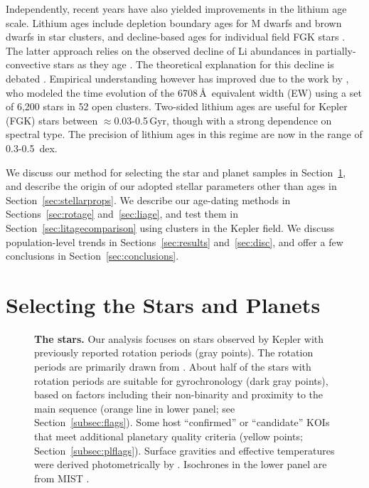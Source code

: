 \documentclass[11pt,twocolumn,tighten,linenumbers]{aastex63}
\begin{document}
Independently, recent years have also yielded improvements in the
lithium age scale.  Lithium ages include depletion boundary ages for M
dwarfs and brown dwarfs in star clusters, and decline-based ages for
individual field FGK stars \citep{Soderblom_2010}.  The latter
approach relies on the observed decline of Li abundances in
partially-convective stars as they age
\citep[e.g.][]{2005A&A...442..615S}.  The theoretical explanation for
this decline is debated
\citep[e.g.][]{1995ApJ...441..865C,2010ApJ...716.1269D,2019MNRAS.485.4052C}.
Empirical understanding however has improved due to the work by
\citet{Jeffries_2023}, who modeled the time evolution of the
 6708\,\AA\ equivalent width (EW) using a set of 6{,}200
stars in 52 open clusters.  Two-sided lithium ages are useful for
Kepler (FGK) stars between $\approx$0.03-0.5\,Gyr, though with a
strong dependence on spectral type.  The precision of lithium ages in
this regime are now in the range of 0.3-0.5~dex.

We discuss our method for selecting the star and planet samples in
Section~\ref{sec:selection}, and describe the origin of our adopted
stellar parameters other than ages in Section~\ref{sec:stellarprops}.
We describe our age-dating methods in Sections~\ref{sec:rotage}
and~\ref{sec:liage}, and test them in
Section~\ref{sec:litagecomparison} using clusters in the Kepler field.
We discuss population-level trends in Sections~\ref{sec:results}
and~\ref{sec:disc}, and offer a few conclusions in
Section~\ref{sec:conclusions}.


\section{Selecting the Stars and Planets}
\label{sec:selection}


\begin{figure}[!t]
	\begin{center}
	
		\vspace{-0.3cm}
	\end{center}
	\vspace{-0.5cm}
  \caption{{\bf The stars.}  Our analysis focuses on stars observed by
  Kepler with previously reported rotation periods (gray points).  The
  rotation periods are primarily drawn from
  \citet{Santos_2019,Santos_2021}.  About half of the stars with
  rotation periods are suitable for gyrochronology (dark gray points),
  based on factors including their non-binarity and proximity to the
  main sequence (orange line in lower panel; see
  Section~\ref{subsec:flags}).  Some host ``confirmed'' or
  ``candidate'' KOIs that meet additional planetary quality criteria
  (yellow points; Section~\ref{subsec:plflags}).  Surface gravities
  and effective temperatures were derived photometrically by
  \citet{Berger_2020a_catalog}.  Isochrones in the lower panel are
  from MIST \citep{Choi_2016}.
	}
	\label{fig:stellarprops}
\end{figure}
\end{document}
